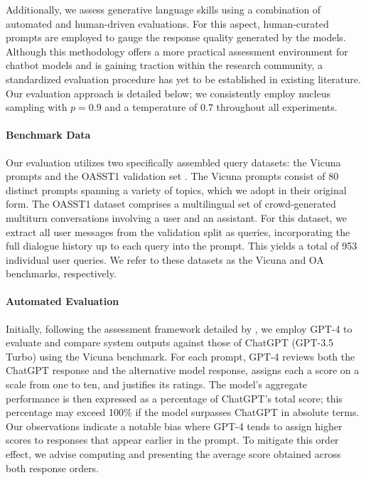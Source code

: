 Additionally, we assess generative language skills using a combination of automated and human-driven evaluations. For this aspect, human-curated prompts are employed to gauge the response quality generated by the models. Although this methodology offers a more practical assessment environment for chatbot models and is gaining traction within the research community, a standardized evaluation procedure has yet to be established in existing literature. Our evaluation approach is detailed below; we consistently employ nucleus sampling with $p=0.9$ and a temperature of $0.7$ throughout all experiments.

\paragraph{Benchmark Data} Our evaluation utilizes two specifically assembled query datasets: the Vicuna prompts \citep{vicuna2023} and the OASST1 validation set \citep{kopf2023openassistant}. The Vicuna prompts consist of 80 distinct prompts spanning a variety of topics, which we adopt in their original form. The OASST1 dataset comprises a multilingual set of crowd-generated multiturn conversations involving a user and an assistant. For this dataset, we extract all user messages from the validation split as queries, incorporating the full dialogue history up to each query into the prompt. This yields a total of 953 individual user queries. We refer to these datasets as the Vicuna and OA benchmarks, respectively.

\paragraph{Automated Evaluation} Initially, following the assessment framework detailed by \citet{vicuna2023}, we employ GPT-4 to evaluate and compare system outputs against those of ChatGPT (GPT-3.5 Turbo) using the Vicuna benchmark. For each prompt, GPT-4 reviews both the ChatGPT response and the alternative model response, assigns each a score on a scale from one to ten, and justifies its ratings. The model's aggregate performance is then expressed as a percentage of ChatGPT's total score; this percentage may exceed 100\% if the model surpasses ChatGPT in absolute terms. Our observations indicate a notable bias where GPT-4 tends to assign higher scores to responses that appear earlier in the prompt. To mitigate this order effect, we advise computing and presenting the average score obtained across both response orders.

